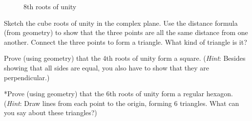 {%
\begin{figure}[hbt]
\begin{center}

\end{center}
\caption{8th roots of unity}
\label{rtsunity}
\end{figure}
 
\begin{exercise}{52}
Sketch the cube roots of unity in the complex plane. Use the distance formula (from geometry) to show that the three points are all the same distance from one another.  Connect the three points to form a triangle. What kind of triangle is it?
\end{exercise}

\begin{exercise}{53}
Prove (using geometry) that the 4th roots of unity form a square. (\emph{Hint}: Besides showing that all sides are equal, you also have to show that they are perpendicular.)
\end{exercise}

\begin{exercise}{54}
*Prove (using geometry) that the 6th roots of unity form a regular hexagon. (\emph{Hint}: Draw lines from each point to the origin, forming 6 triangles. What can you say about these triangles?)
\end{exercise}

}
